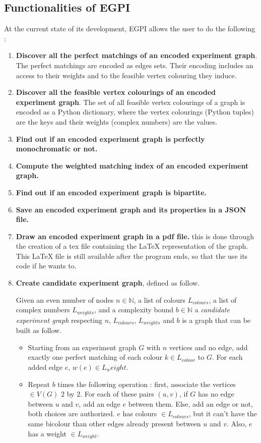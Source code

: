 \subsection{Functionalities of EGPI}

At the current state of its development, EGPI allows the user to do the following :

\begin{enumerate}
    \item \textbf{Discover all the perfect matchings of an encoded experiment graph}. The perfect matchings are encoded as edges sets. Their encoding includes an access to their weights and to the feasible vertex colouring they induce.
    \item \textbf{Discover all the feasible vertex colourings of an encoded experiment graph}. The set of all feasible vertex colourings of a graph is encoded as a Python dictionary, where the vertex colourings (Python tuples) are the keys and their weights (complex numbers) are the values.
    \item \textbf{Find out if an encoded experiment graph is perfectly monochromatic or not.}
    \item \textbf{Compute the weighted matching index of an encoded experiment graph.}
    \item \textbf{Find out if an encoded experiment graph is bipartite.}
    \item \textbf{Save an encoded experiment graph and its properties in a JSON file.}
    \item \textbf{Draw an encoded experiment graph in a pdf file.} this is done through the creation of a tex file containing the LaTeX representation of the graph. This LaTeX file is still available after the program ends, so that the use its code if he wants to.
    \item \textbf{Create candidate experiment graph}, defined as follow.
    \begin{definition}
        Given an even number of nodes $n \in \mathbb{N}$, a list of colours $L_{colours}$, a list of complex numbers $L_{weights}$, and a complexity bound $b \in \mathbb{N}$ a \textit{candidate experiment graph} respecting $n$, $L_{colours}$, $L_{weights}$ and $b$ is a graph that can be built as follow.

        \begin{itemize}
            \item Starting from an experiment graph $G$ with $n$ vertices and no edge, add exactly one perfect matching of each colour $k \in L_{colour}$ to $G$. For each added edge $e$, $w(e) \in L_weight$.
            \item Repeat $b$ times the following operation : first, associate the vertices $\in V(G)$ $2$ by $2$. For each of these pairs $(u, v)$, if $G$ has no edge between $u$ and $v$, add an edge $e$ between them. Else, add an edge or not, both choices are authorized. $e$ has colours $\in L_{colours}$, but it can't have the same bicolour than other edges already present between $u$ and $v$. Also, $e$ has a weight $\in L_{weight}$.
        \end{itemize}
    \end{definition}


\end{enumerate}
